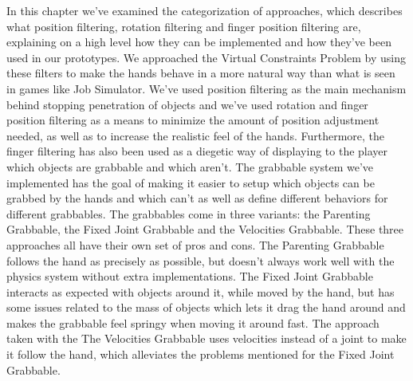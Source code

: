 In this chapter we've examined the categorization of approaches, which describes what position filtering, rotation filtering and finger position filtering are, explaining on a high level how they can be implemented and how they've been used in our prototypes. We approached the Virtual Constraints Problem by using these filters to make the hands behave in a more natural way than what is seen in games like Job Simulator. We've used position filtering as the main mechanism behind stopping penetration of objects and we've used rotation and finger position filtering as a means to minimize the amount of position adjustment needed, as well as to increase the realistic feel of the hands. Furthermore, the finger filtering has also been used as a diegetic way of displaying to the player which objects are grabbable and which aren't. The grabbable system we've implemented has the goal of making it easier to setup which objects can be grabbed by the hands and which can't as well as define different behaviors for different grabbables. The grabbables come in three variants: the Parenting Grabbable, the Fixed Joint Grabbable and the Velocities Grabbable. These three approaches all have their own set of pros and cons. The Parenting Grabbable follows the hand as precisely as possible, but doesn't always work well with the physics system without extra implementations. The Fixed Joint Grabbable interacts as expected with objects around it, while moved by the hand, but has some issues related to the mass of objects which lets it drag the hand around and makes the grabbable feel springy when moving it around fast. The approach taken with the The Velocities Grabbable uses velocities instead of a joint to make it follow the hand, which alleviates the problems mentioned for the Fixed Joint Grabbable.

